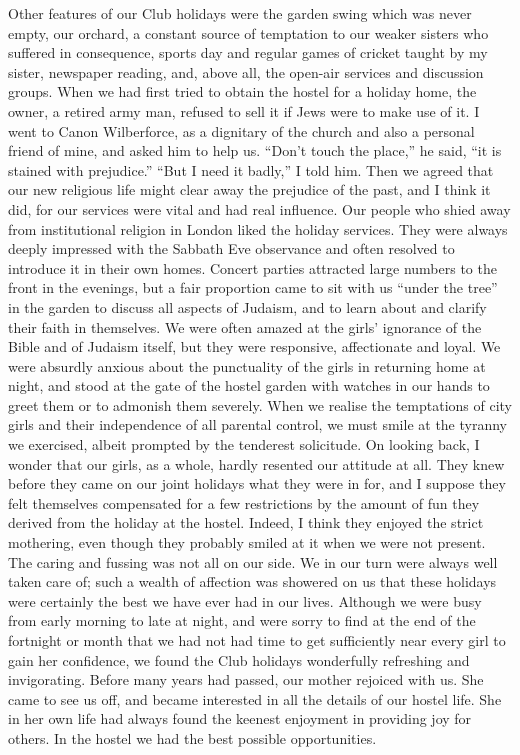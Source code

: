 Other features of our Club holidays were the garden
swing which was never empty, our orchard, a constant
source of temptation to our weaker sisters who suffered
in consequence, sports day and regular games of cricket
taught by my sister, newspaper reading, and, above all,
the open-air services and discussion groups. When we
had first tried to obtain the hostel for a holiday home, the
owner, a retired army man, refused to sell it if Jews were
to make use of it. I went to Canon Wilberforce, as a
dignitary of the church and also a personal friend of
mine, and asked him to help us. “Don’t touch the place,”
he said, “it is stained with prejudice.” “But I need it
badly,” I told him. Then we agreed that our new
religious life might clear away the prejudice of the past,
and I think it did, for our services were vital and had
real influence. Our people who shied away from institutional
religion in London liked the holiday services. They
were always deeply impressed with the Sabbath Eve
observance and often resolved to introduce it in their own
homes. Concert parties attracted large numbers to the
front in the evenings, but a fair proportion came to sit
with us “under the tree” in the garden to discuss all
aspects of Judaism, and to learn about and clarify their
faith in themselves. We were often amazed at the girls’
ignorance of the Bible and of Judaism itself, but they were
responsive, affectionate and loyal. We were absurdly
anxious about the punctuality of the girls in returning
home at night, and stood at the gate of the hostel garden
with watches in our hands to greet them or to admonish
them severely. When we realise the temptations of city
girls and their independence of all parental control, we
must smile at the tyranny we exercised, albeit prompted
by the tenderest solicitude. On looking back, I wonder
that our girls, as a whole, hardly resented our attitude
at all. They knew before they came on our joint holidays
what they were in for, and I suppose they felt themselves
compensated for a few restrictions by the amount of fun
they derived from the holiday at the hostel. Indeed, I
think they enjoyed the strict mothering, even though they
probably smiled at it when we were not present. The
caring and fussing was not all on our side. We in our
turn were always well taken care of; such a wealth of
affection was showered on us that these holidays were
certainly the best we have ever had in our lives. Although
we were busy from early morning to late at night, and
were sorry to find at the end of the fortnight or month
that we had not had time to get sufficiently near every
girl to gain her confidence, we found the Club holidays
wonderfully refreshing and invigorating. Before many
years had passed, our mother rejoiced with us. She came
to see us off, and became interested in all the details of
our hostel life. She in her own life had always found the
keenest enjoyment in providing joy for others. In the
hostel we had the best possible opportunities.

